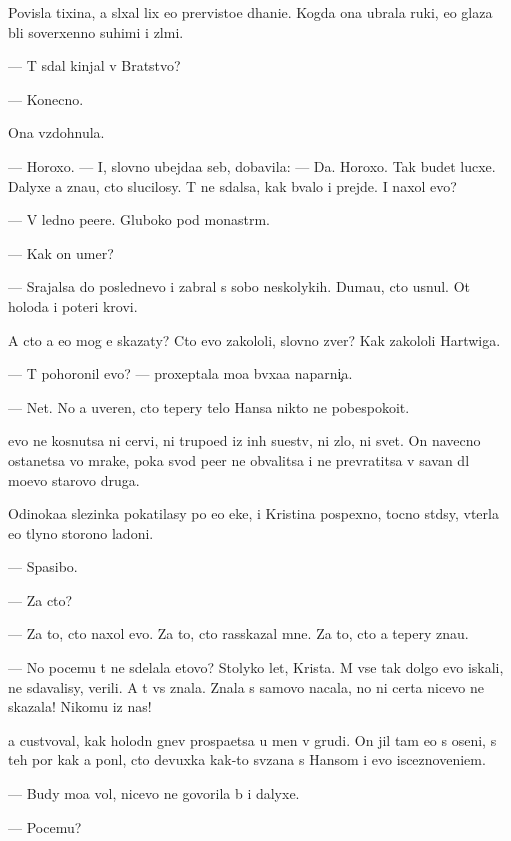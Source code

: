 \documentclass[10pt]{book}
\begin{document}
Povisla tixina, {\y}a sl{\yi}xal lix {\y}e{\y}o prer{\yi}visto{\y}e d{\yi}hani{\y}e. Kogda ona ubrala ruki, {\y}e{\y}o glaza b{\yi}li soverxenno suhimi i zl{\yi}mi.

— T{\yi} sdal kinjal v Bratstvo?

— Konecno.

Ona vzdohnula.

— Horoxo. — I, slovno ubejda{\y}a seb{\ia}, dobavila: — Da. Horoxo. Tak budet lucxe. Dalyxe {\y}a zna{\y}u, cto slucilosy. T{\yi} ne sdalsa, kak b{\yi}valo i prejde. I naxol {\y}evo?

— V led{\ia}no{\y} pe{\x}ere. Gluboko pod monast{\yi}r{\e}m.

— Kak on umer?

— Srajalsa do poslednevo i zabral s sobo{\y} neskolykih. Duma{\y}u, cto usnul. Ot holoda i poteri krovi.

A cto {\y}a {\y}e{\x}o mog {\y}e{\y} skazaty? Cto {\y}evo zakololi, slovno zver{\ia}? Kak zakololi Hartwiga.

— T{\yi} pohoronil {\y}evo? — proxeptala mo{\y}a b{\yi}vxa{\y}a naparni{\c}a.

— Net. No {\y}a uveren, cto tepery telo Hansa nikto ne pobespoko{\y}it.

{\Y}evo ne kosnutsa ni cervi, ni trupo{\y}ed{\yi} iz in{\yi}h su{\x}estv, ni zlo, ni svet. On navecno ostanetsa vo mrake, poka svod pe{\x}er{\yi} ne obvalitsa i ne prevratitsa v savan dl{\ia} mo{\y}evo starovo druga.

Odinoka{\y}a slezinka pokatilasy po {\y}e{\y}o {\x}eke, i Kristina pospexno, tocno st{\yi}d{\ia}sy, v{\yi}terla {\y}e{\y}o t{\yi}lyno{\y} storono{\y} ladoni.

— Spasibo.

— Za cto?

— Za to, cto naxol {\y}evo. Za to, cto rasskazal mne. Za to, cto {\y}a tepery zna{\y}u.

— No pocemu t{\yi} ne sdelala etovo? Stolyko let, Krista. M{\yi} vse tak dolgo {\y}evo iskali, ne sdavalisy, verili. A t{\yi} vs{\e} znala. Znala s samovo nacala, no ni certa nicevo ne skazala! Nikomu iz nas!

{\Y}a custvoval, kak holodn{\yi}{\y} gnev pros{\yi}pa{\y}etsa u men{\ia} v grudi. On jil tam {\y}e{\x}o s oseni, s teh por kak {\y}a pon{\ia}l, cto devuxka kak-to sv{\ia}zana s Hansom i {\y}evo isceznoveni{\y}em.

— Budy mo{\y}a vol{\ia}, nicevo ne govorila b{\yi} i dalyxe.

— Po\-ce\-mu?
\end{document}
